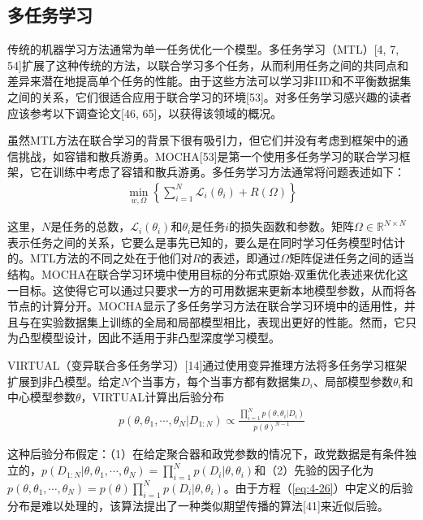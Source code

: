 \subsection{多任务学习}
传统的机器学习方法通常为单一任务优化一个模型。多任务学习（MTL）[4, 7, 54]扩展了这种传统的方法，以联合学习多个任务，从而利用任务之间的共同点和差异来潜在地提高单个任务的性能。由于这些方法可以学习非IID和不平衡数据集之间的关系，它们很适合应用于联合学习的环境[53]。对多任务学习感兴趣的读者应该参考以下调查论文[46, 65]，以获得该领域的概况。

虽然MTL方法在联合学习的背景下很有吸引力，但它们并没有考虑到框架中的通信挑战，如容错和散兵游勇。MOCHA[53]是第一个使用多任务学习的联合学习框架，它在训练中考虑了容错和散兵游勇。多任务学习方法通常将问题表述如下：
\begin{align}
	\min_{w, \Omega} \left\{ \sum_{i=1}^{N}\mathcal{L}_{i}(\theta_{i}) + R(\Omega) \right\} \label{eq:4-25}
\end{align}

这里，$N$是任务的总数，$\mathcal{L}_{i}(\theta_{i})$和$\theta_{i}$是任务$i$的损失函数和参数。矩阵$\Omega \in \mathbb{R}^{N \times N}$表示任务之间的关系，它要么是事先已知的，要么是在同时学习任务模型时估计的。MTL方法的不同之处在于他们对$R$的表述，即通过$\Omega$矩阵促进任务之间的适当结构。MOCHA在联合学习环境中使用目标的分布式原始-双重优化表述来优化这一目标。这使得它可以通过只要求一方的可用数据来更新本地模型参数，从而将各节点的计算分开。MOCHA显示了多任务学习方法在联合学习环境中的适用性，并且与在实验数据集上训练的全局和局部模型相比，表现出更好的性能。然而，它只为凸型模型设计，因此不适用于非凸型深度学习模型。

VIRTUAL（变异联合多任务学习）[14]通过使用变异推理方法将多任务学习框架扩展到非凸模型。给定$N$个当事方，每个当事方都有数据集$D_{i}$、局部模型参数$\theta_{i}$和中心模型参数$\theta$，VIRTUAL计算出后验分布
\begin{align}
	p(\theta, \theta_{1}, \cdots, \theta_{N} | D_{1:N}) \propto \frac{\prod_{i=1}^{N} p(\theta, \theta_{i} | D_{i})}{p(\theta)^{N-1}} \label{eq:4-26}
\end{align}

这种后验分布假定：（1）在给定聚合器和政党参数的情况下，政党数据是有条件独立的，$p(D_{1:N} | \theta, \theta_{1}, \cdots, \theta_{N}) = \prod_{i=1}^{N} p(D_{i} | \theta, \theta_{i})$和（2）先验的因子化为$p(\theta, \theta_{1}, \cdots, \theta_{N}) = p(\theta) \prod_{i=1}^{N}p(D_{i} | \theta, \theta_{i})$。由于方程（\ref{eq:4-26}）中定义的后验分布是难以处理的，该算法提出了一种类似期望传播的算法[41]来近似后验。

